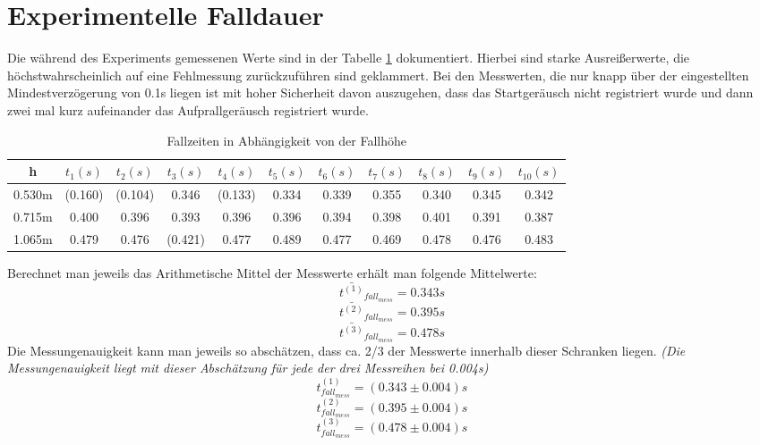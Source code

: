 \documentclass{report}
\begin{document}
    \section{Experimentelle Falldauer}
    Die während des Experiments gemessenen Werte sind in der Tabelle \ref{tab:fallzeitenFallhoehe} dokumentiert. Hierbei sind starke Ausreißerwerte, die
    höchstwahrscheinlich auf eine Fehlmessung zurückzuführen sind geklammert. Bei den Messwerten, die nur knapp über der eingestellten Mindestverzögerung von
    0.1s liegen ist mit hoher Sicherheit davon auszugehen, dass das Startgeräusch nicht registriert wurde und dann zwei mal kurz aufeinander das Aufprallgeräusch registriert wurde. 
    \begin{scriptsize}
    \begin{table}[H]
    \centering
    \caption{Fallzeiten in Abhängigkeit von der Fallhöhe}
    \label{tab:fallzeitenFallhoehe}
    \begin{tabular}{ c||c|c|c|c|c|c|c|c|c|c }
        h & $t_1(s) $ & $t_2(s)$ & $t_3(s)$ & $t_4(s)$ & $t_5(s)$ & $t_6(s)$ & $t_7(s)$ & $t_8(s)$ & $t_9(s)$ & $t_{10}(s)$\\
        \hline
        0.530m & (0.160) & (0.104) & 0.346 & (0.133) & 0.334 & 0.339 & 0.355 & 0.340 & 0.345 & 0.342 \\
        0.715m & 0.400 & 0.396 & 0.393 & 0.396 & 0.396 & 0.394 & 0.398 & 0.401 & 0.391 & 0.387 \\
        1.065m & 0.479 & 0.476 & (0.421) & 0.477 & 0.489 & 0.477 & 0.469 & 0.478 & 0.476 & 0.483 \\
    \end{tabular}
    \end{table}
    \end{scriptsize}
    \noindent
    Berechnet man jeweils das Arithmetische Mittel der Messwerte erhält man folgende Mittelwerte:
    \begin{equation*}
        \bar{t^{(1)}}_{fall_{mess}} = 0.343s
    \end{equation*}
    \begin{equation*}
        \bar{t^{(2)}}_{fall_{mess}} = 0.395s
    \end{equation*}
    \begin{equation*}
        \bar{t^{(3)}}_{fall_{mess}} = 0.478s
    \end{equation*}
    Die Messungenauigkeit kann man jeweils so abschätzen, dass ca. 2/3 der Messwerte innerhalb dieser Schranken liegen.
    \textit{(Die Messungenauigkeit liegt mit dieser Abschätzung für jede der drei Messreihen bei 0.004s)}
    \begin{equation*}
        t^{(1)}_{fall_{mess}} = (0.343 \pm 0.004)s
    \end{equation*}
    \begin{equation*}
        t^{(2)}_{fall_{mess}} = (0.395 \pm 0.004)s
    \end{equation*}
    \begin{equation*}
        t^{(3)}_{fall_{mess}} = (0.478 \pm 0.004)s
    \end{equation*}
\end{document}
